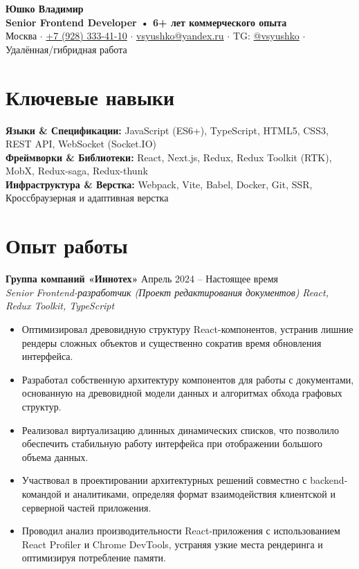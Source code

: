 \documentclass[10pt,a4paper]{article}
\begin{document}
\begin{center}
    {\fontsize{26}{30}\selectfont\bfseries\color{primaryColor} Юшко Владимир} \\ \vspace{2pt}
    {\large \bfseries \color{secondaryColor} Senior Frontend Developer • 6+ лет коммерческого опыта} \\ \vspace{6pt}
    \small 
    Москва $\cdot$ 
    \href{tel:+79283334110}{+7 (928) 333-41-10} $\cdot$ 
    \href{mailto:vsyushko@yandex.ru}{vsyushko@yandex.ru} $\cdot$ 
    TG: \href{https://t.me/vsyushko}{@vsyushko} $\cdot$ 
    Удалённая/гибридная работа 
\end{center}

\section*{Ключевые навыки}
\noindent \small
\textbf{Языки \& Спецификации:} JavaScript (ES6+), TypeScript, HTML5, CSS3, REST API, WebSocket (Socket.IO)  \\
\textbf{Фреймворки \& Библиотеки:} React, Next.js, Redux, Redux Toolkit (RTK), MobX, Redux-saga, Redux-thunk  \\
\textbf{Инфраструктура \& Верстка:} Webpack, Vite, Babel, Docker, Git, SSR, Кроссбраузерная и адаптивная верстка 

\section*{Опыт работы}

\noindent \small
\textbf{Группа компаний «Иннотех»} \hfill Апрель 2024 -- Настоящее время \\
\textit{Senior Frontend-разработчик (Проект редактирования документов)} \hfill \textit{React, Redux Toolkit, TypeScript} 
\begin{itemize}
  \item Оптимизировал древовидную структуру React-компонентов, устранив лишние рендеры сложных объектов и существенно сократив время обновления интерфейса.
  \item Разработал собственную архитектуру компонентов для работы с документами, основанную на древовидной модели данных и алгоритмах обхода графовых структур.
  \item Реализовал виртуализацию длинных динамических списков, что позволило обеспечить стабильную работу интерфейса при отображении большого объема данных.
  \item Участвовал в проектировании архитектурных решений совместно с backend-командой и аналитиками, определяя формат взаимодействия клиентской и серверной частей приложения.
  \item Проводил анализ производительности React-приложения с использованием React Profiler и Chrome DevTools, устраняя узкие места рендеринга и оптимизируя потребление памяти.
\end{itemize}
\end{document}
